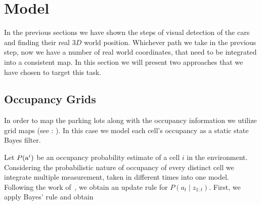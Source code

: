 
\section{Model} %
\label{sec:model}

    In the previous sections we have shown the steps of visual detection of
    the cars and finding their real $3D$ world position. Whichever path we
    take in the previous step, now we have a number of real world coordinates,
    that need to be integrated into a consistent map. In this section we will
    present two approaches that we have chosen to target this task.

    \subsection{Occupancy Grids}\label{sub:occupancy_grids}

        In order to map the parking lots along with the occupancy information
        we utilize grid maps (see :
        ). In this case we model each cell's
        occupancy as a static state Bayes filter.

        Let $P({\mbox{a}^i})$ be an occupancy probability estimate of a cell $i$ in the
        environment. Considering the probabilistic nature of occupancy of
        every distinct cell we integrate multiple measurement, taken in
        different times into one model. Following the work
        of~\cite{occupancy_grids}, we obtain an update rule for $P(a_t\mid
        z_{1:t})$. First, we apply Bayes' rule and obtain


